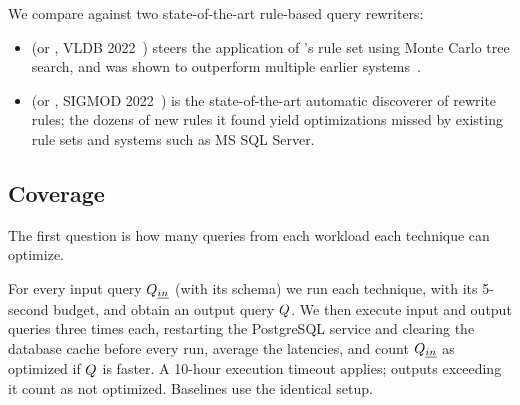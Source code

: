 We compare against two state-of-the-art rule-based query rewriters:

\begin{itemize}[leftmargin=*]
\item
\textbf{\learnedrewrite} (or \LR, VLDB 2022~\cite{LR,LR-source-code})
steers the application of \calcite's rule set using Monte Carlo tree
search, and was shown to outperform multiple earlier
systems~\cite{begoli2018apache,pirahesh1992extensible}.

\item 
\textbf{\wetune} (or \WT, SIGMOD 2022~\cite{wetune,WT-source-code})
is the state-of-the-art automatic discoverer of rewrite rules; the
dozens of new rules it found yield optimizations missed by existing
rule sets and systems such as MS SQL Server.

\end{itemize}

\subsection{Coverage}
\label{slab:sec:q1-coverage}

The first question is how many queries from each workload each
technique can optimize.

For every input query $Q_{\emph{in}}$ (with its schema) we run each
technique, \toolname with its 5-second budget, and obtain an output
query $Q$. We then execute input and output queries three times
each, restarting the PostgreSQL service and clearing the database
cache before every run, average the latencies, and count $Q_{\emph{in}}$
as optimized if $Q$ is faster. A 10-hour execution timeout
applies; outputs exceeding it count as not optimized. Baselines use
the identical setup.

